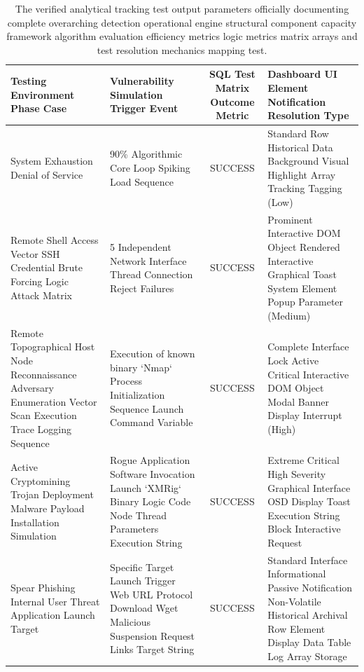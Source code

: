 \begin{table}[h]
\centering
\small
\begin{tabularx}{\textwidth}{|X|X|c|X|}
\hline
\textbf{Testing Environment Phase Case} & \textbf{Vulnerability Simulation Trigger Event} & \textbf{SQL Test Matrix Outcome Metric} & \textbf{Dashboard UI Element Notification Resolution Type} \\ \hline
System Exhaustion Denial of Service & 90\% Algorithmic Core Loop Spiking Load Sequence & SUCCESS & Standard Row Historical Data Background Visual Highlight Array Tracking Tagging (Low) \\ \hline
Remote Shell Access Vector SSH Credential Brute Forcing Logic Attack Matrix  & 5 Independent Network Interface Thread Connection Reject Failures & SUCCESS & Prominent Interactive DOM Object Rendered Interactive Graphical Toast System Element Popup Parameter (Medium) \\ \hline
Remote Topographical Host Node Reconnaissance Adversary Enumeration Vector Scan Execution Trace Logging Sequence & Execution of known binary `Nmap` Process Initialization Sequence Launch Command Variable & SUCCESS & Complete Interface Lock Active Critical Interactive DOM Object Modal Banner Display Interrupt (High) \\ \hline
Active Cryptomining Trojan Deployment Malware Payload Installation Simulation & Rogue Application Software Invocation Launch `XMRig` Binary Logic Code Node Thread Parameters Execution String  & SUCCESS & Extreme Critical High Severity Graphical Interface OSD Display Toast Execution String Block Interactive Request \\ \hline
Spear Phishing Internal User Threat Application Launch Target  & Specific Target Launch Trigger Web URL Protocol Download Wget Malicious Suspension Request Links Target String  & SUCCESS & Standard Interface Informational Passive Notification Non-Volatile Historical Archival Row Element Display Data Table Log Array Storage \\ \hline
\end{tabularx}
\caption{The verified analytical tracking test output parameters officially documenting complete overarching detection operational engine structural component capacity framework algorithm evaluation efficiency metrics logic metrics matrix arrays and test resolution mechanics mapping test.}
\end{table}

